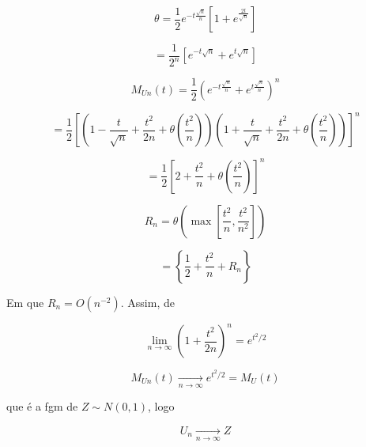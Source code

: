 \begin{equation}
\theta = \frac{1}{2} e^{-t\frac{\sqrt{n}}{n}} \left[ 1 + e^{\frac{2t}{\sqrt{n}}} \right]
\end{equation}

\begin{equation}
= \frac{1}{2^n} \left[ e^{-t\sqrt{n}} + e^{t\sqrt{n}} \right]
\end{equation}

\begin{equation}
M_{Un}(t) = \frac{1}{2} \left( e^{-t\frac{\sqrt{n}}{n}} + e^{t\frac{\sqrt{n}}{n}} \right)^n
\end{equation}

\begin{equation}
= \frac{1}{2} \left[ \left( 1 - \frac{t}{\sqrt{n}} + \frac{t^2}{2n} + \theta\left( \frac{t^2}{n} \right) \right) \left( 1 + \frac{t}{\sqrt{n}} + \frac{t^2}{2n} + \theta\left( \frac{t^2}{n} \right) \right) \right]^n
\end{equation}

\begin{equation}
= \frac{1}{2} \left[ 2 + \frac{t^2}{n} + \theta\left( \frac{t^2}{n} \right) \right]^n
\end{equation}

\begin{equation}
R_n = \theta\left( \max\left[ \frac{t^2}{n}, \frac{t^2}{n^2} \right] \right)
\end{equation}

\begin{equation}
= \left\{ \frac{1}{2} + \frac{t^2}{n} + R_n \right\}
\end{equation}

Em que $R_n = O(n^{-2})$. Assim, de

\begin{equation}
\lim_{n \to \infty} \left( 1 + \frac{t^2}{2n} \right)^n = e^{t^2/2}
\end{equation}

\begin{equation}
M_{Un}(t) \xrightarrow[n \to \infty]{} e^{t^2/2} = M_U(t)
\end{equation}

que é a fgm de $Z \sim N(0,1)$, logo

\begin{equation}
U_n \xrightarrow[n \to \infty]{} Z
\end{equation}